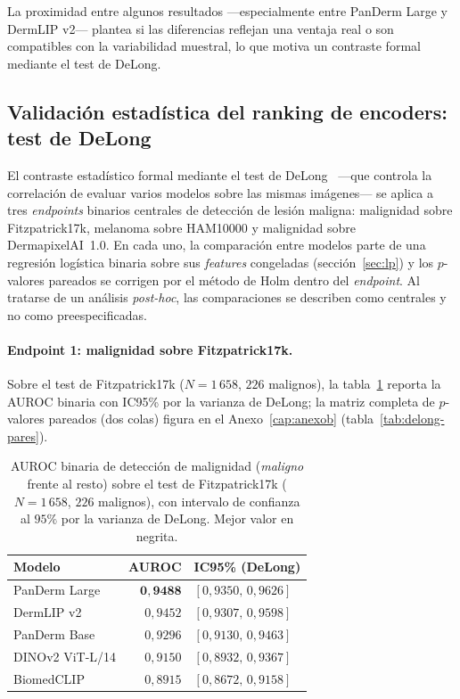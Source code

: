 La proximidad entre algunos resultados ---especialmente entre PanDerm
Large y DermLIP v2--- plantea si las diferencias reflejan una ventaja
real o son compatibles con la variabilidad muestral, lo que motiva un
contraste formal mediante el test de DeLong.

\subsection{Validación estadística del ranking de encoders: test de
DeLong}
\label{sec:equidad-delong}

El contraste estadístico formal mediante el test de
DeLong~\cite{delong1988} ---que controla la correlación de evaluar
varios modelos sobre las mismas imágenes--- se aplica a tres
\emph{endpoints} binarios centrales de detección de lesión maligna:
malignidad sobre Fitzpatrick17k, melanoma sobre HAM10000 y malignidad
sobre DermapixelAI~1.0. En cada uno, la comparación entre modelos parte
de una regresión logística binaria sobre sus \emph{features} congeladas
(sección~\ref{sec:lp}) y los $p$-valores pareados se corrigen por el
método de Holm dentro del \emph{endpoint}. Al tratarse de un análisis
\emph{post-hoc}, las comparaciones se describen como centrales y no como
preespecificadas.

\paragraph{Endpoint 1: malignidad sobre Fitzpatrick17k.}
Sobre el test de Fitzpatrick17k ($N = 1\,658$, $226$ malignos), la
tabla~\ref{tab:delong-auroc} reporta la AUROC binaria con IC95\% por la
varianza de DeLong; la matriz completa de $p$-valores pareados (dos
colas) figura en el Anexo~\ref{cap:anexob}
(tabla~\ref{tab:delong-pares}).

\begin{table}[H]
\centering
\footnotesize
\setlength{\tabcolsep}{4pt}
\renewcommand{\arraystretch}{0.95}
\caption{AUROC binaria de detección de malignidad (\emph{maligno}
frente al resto) sobre el test de Fitzpatrick17k
($N = 1\,658$, $226$ malignos), con intervalo de confianza al
$95\%$ por la varianza de DeLong. Mejor valor en negrita.}
\label{tab:delong-auroc}
\begin{tabular}{lrl}
\hline
Modelo            & AUROC               & IC95\% (DeLong) \\
\hline
PanDerm Large     & $\mathbf{0{,}9488}$ & $[0{,}9350,\, 0{,}9626]$ \\
DermLIP v2        & $0{,}9452$          & $[0{,}9307,\, 0{,}9598]$ \\
PanDerm Base      & $0{,}9296$          & $[0{,}9130,\, 0{,}9463]$ \\
DINOv2 ViT-L/14   & $0{,}9150$          & $[0{,}8932,\, 0{,}9367]$ \\
BiomedCLIP        & $0{,}8915$          & $[0{,}8672,\, 0{,}9158]$ \\
\hline
\end{tabular}
\end{table}

